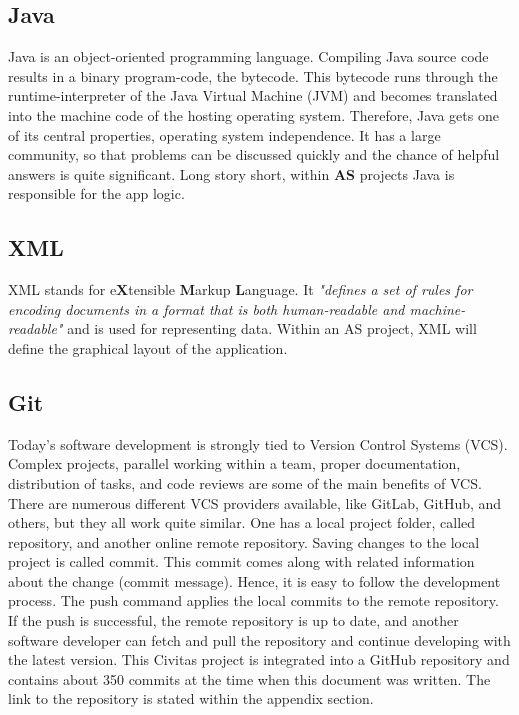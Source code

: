 \subsection{Java}
Java is an object-oriented programming language. Compiling Java source code results in a binary program-code, the bytecode. This bytecode runs through the runtime-interpreter of the Java Virtual Machine (JVM) and becomes translated into the machine code of the hosting operating system. Therefore, Java gets one of its central properties, operating system independence. It has a large community, so that problems can be discussed quickly and the chance of helpful answers is quite significant. Long story short, within \textbf{AS} projects Java is responsible for the app logic.

\subsection{XML}
XML stands for e\textbf{X}tensible \textbf{M}arkup \textbf{L}anguage. It \textit{"defines a set of rules for encoding documents in a format that is both human-readable and machine-readable"} \cite{wiki:xml} and is used for representing data. Within an AS project, XML will define the graphical layout of the application.

\subsection{Git}
Today's software development is strongly tied to Version Control Systems (VCS). Complex projects, parallel working within a team, proper documentation, distribution of tasks, and code reviews are some of the main benefits of VCS. There are numerous different VCS providers available, like GitLab, GitHub, and others, but they all work quite similar. One has a local project folder, called repository, and another online remote repository. Saving changes to the local project is called commit. This commit comes along with related information about the change (commit message). Hence, it is easy to follow the development process. The push command applies the local commits to the remote repository. If the push is successful, the remote repository is up to date, and another software developer can fetch and pull the repository and continue developing with the latest version. 
This Civitas project is integrated into a GitHub repository and contains about 350 commits at the time when this document was written.
The link to the repository is stated within the appendix section.



